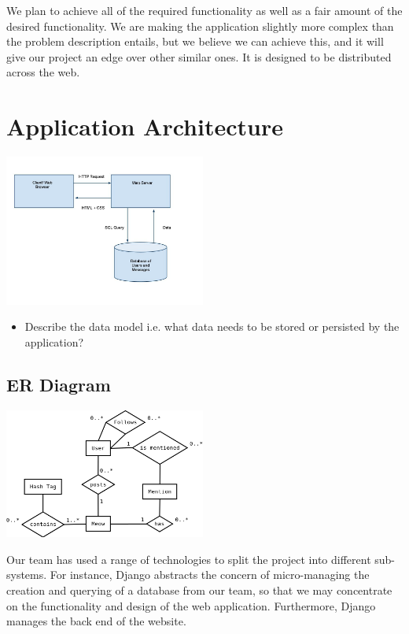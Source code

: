 \documentclass{sig-alt-release2}
\begin{document}
We plan to achieve all of the required functionality as well as a fair amount of the desired functionality. We are making the application slightly more complex than the problem description entails, but we believe we can achieve this, and it will give our project an edge over other similar ones. It is designed to be distributed across the web.

\section{Application Architecture}

\includegraphics[width=250px]{images/architecture.jpg}

\begin{itemize}

\item	Describe the data model i.e. what data needs to be stored or persisted by the application?

\end{itemize}

\subsection{ER Diagram}

\includegraphics[width=250px]{images/erdiagram.png}

Our team has used a range of technologies to split the project into different sub-systems. For instance, Django abstracts the concern of micro-managing the creation and querying of a database from our team, so that we may concentrate on the functionality and design of the web application. Furthermore, Django manages the back end of the website. 
\end{document}
